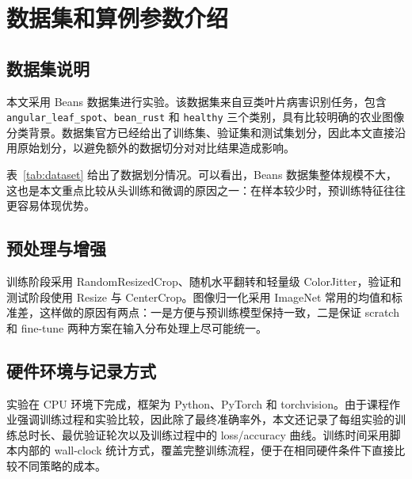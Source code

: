 \section{数据集和算例参数介绍}

\subsection{数据集说明}

本文采用 Beans 数据集进行实验。该数据集来自豆类叶片病害识别任务，包含 \texttt{angular\_leaf\_spot}、\texttt{bean\_rust} 和 \texttt{healthy} 三个类别，具有比较明确的农业图像分类背景。数据集官方已经给出了训练集、验证集和测试集划分，因此本文直接沿用原始划分，以避免额外的数据切分对对比结果造成影响。

表~\ref{tab:dataset} 给出了数据划分情况。可以看出，Beans 数据集整体规模不大，这也是本文重点比较从头训练和微调的原因之一：在样本较少时，预训练特征往往更容易体现优势。

\begin{table}[t]
    \caption{Beans 数据集划分统计}
    \label{tab:dataset}
    \centering
    \resizebox{\columnwidth}{!}{}
\end{table}

\subsection{预处理与增强}

训练阶段采用 RandomResizedCrop、随机水平翻转和轻量级 ColorJitter，验证和测试阶段使用 Resize 与 CenterCrop。图像归一化采用 ImageNet 常用的均值和标准差，这样做的原因有两点：一是方便与预训练模型保持一致，二是保证 scratch 和 fine-tune 两种方案在输入分布处理上尽可能统一。

\subsection{硬件环境与记录方式}

实验在 CPU 环境下完成，框架为 Python、PyTorch 和 torchvision。由于课程作业强调训练过程和实验比较，因此除了最终准确率外，本文还记录了每组实验的训练总时长、最优验证轮次以及训练过程中的 loss/accuracy 曲线。训练时间采用脚本内部的 wall-clock 统计方式，覆盖完整训练流程，便于在相同硬件条件下直接比较不同策略的成本。
